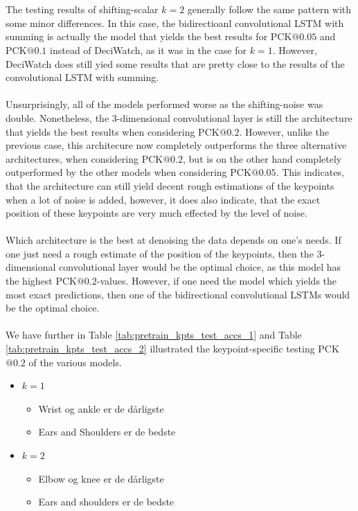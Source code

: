 \documentclass[./main.tex]{subfiles}
\begin{document}
\\
\\
The testing results of shifting-scalar $k = 2$ generally follow the same pattern with some minor differences. In this case, the bidirectioanl convolutional LSTM with summing is actually the model that yields the best results for PCK$@0.05$ and PCK$@0.1$ instead of DeciWatch, as it was in the case for $k = 1$. However, DeciWatch does still yied some results that are pretty close to the results of the convolutional LSTM with summing.
\\
\\
Unsurprisingly, all of the models performed worse as the shifting-noise was double. Nonetheless, the 3-dimensional convolutional layer is still the architecture that yields the best results when considering PCK$@0.2$. However, unlike the previous case, this architecure now completely outperforms the three alternative architectures, when considering PCK$@0.2$, but is on the other hand completely outperformed by the other models when considering PCK$@0.05$. This indicates, that the architecture can still yield decent rough estimations of the keypoints when a lot of noise is added, however, it does also indicate, that the exact position of these keypoints are very much effected by the level of noise.
\\
\\
Which architecture is the best at denoising the data depends on one's needs. If one just need a rough estimate of the position of the keypoints, then the 3-dimensional convolutional layer would be the optimal choice, as this model has the highest PCK$@0.2$-values. However, if one need the model which yields the most exact predictions, then one of the bidirectional convolutional LSTMs would be the optimal choice.
\\
\\
We have further in Table \ref{tab:pretrain_kpts_test_accs_1} and Table \ref{tab:pretrain_kpts_test_accs_2} illustrated the keypoint-specific testing PCK$@0.2$ of the various models.
\begin{itemize}
    \item $k = 1$
    \begin{itemize}
        \item Wrist og ankle er de dårligste
        \item Ears and Shoulders er de bedste
    \end{itemize}
    \item $k = 2$
    \begin{itemize}
        \item Elbow og knee er de dårligste
        \item Ears and shoulders er de bedste
    \end{itemize}
\end{itemize}
\end{document}
